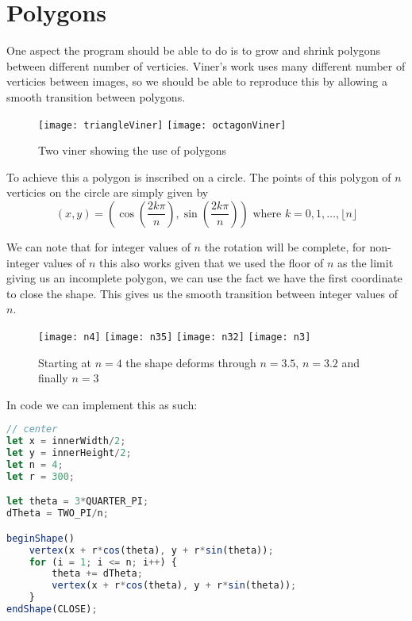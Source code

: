 \section{Polygons}
One aspect the program should be able to do is to grow and shrink polygons
between different number of verticies. Viner's work uses many different number
of verticies between images, so we should be able to reproduce this by allowing
a smooth transition between polygons. 

\begin{figure}[H]
    \centering
    \texttt{[image: triangleViner]}
    \hspace{0.2cm}
    \texttt{[image: octagonViner]}
    \caption{Two viner showing the use of polygons}
\end{figure}


To achieve this a polygon is inscribed on a circle. The points of this polygon
of $n$ verticies on the circle are simply given by $$(x, y) = (\cos(\frac{2k
\pi}{n}), \sin(\frac{2k\pi}{n})) \text{ where } k = 0, 1, \ldots, \lfloor n
\rfloor$$ 

We can note that for integer values of $n$ the rotation will be complete, for
non-integer values of $n$ this also works given that we used the floor of $n$ as
the limit giving us an incomplete polygon, we can use the fact we have the first
coordinate to close the shape. This gives us the smooth transition between
integer values of $n$.

\begin{figure}[H]
    \centering
    \texttt{[image: n4]}
    \texttt{[image: n35]}
    \texttt{[image: n32]}
    \texttt{[image: n3]}
    \caption{Starting at $n=4$ the shape deforms through $n=3.5$, $n=3.2$ and
    finally $n=3$}
\end{figure}

In code we can implement this as such:
\begin{lstlisting}[language=JavaScript]
// center
let x = innerWidth/2;
let y = innerHeight/2;
let n = 4;
let r = 300;

let theta = 3*QUARTER_PI;
dTheta = TWO_PI/n;

beginShape()
    vertex(x + r*cos(theta), y + r*sin(theta));
    for (i = 1; i <= n; i++) {
        theta += dTheta;
        vertex(x + r*cos(theta), y + r*sin(theta));
    }
endShape(CLOSE);
\end{lstlisting}

